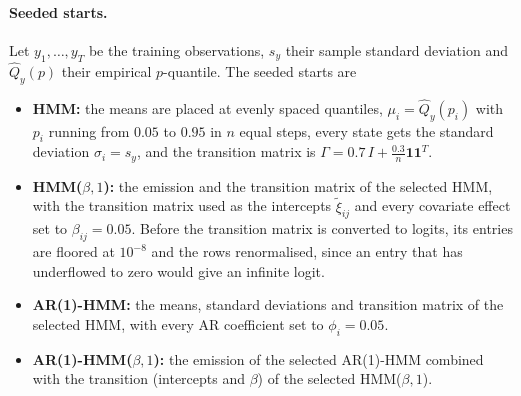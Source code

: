 \paragraph{Seeded starts.}
Let $y_1, \dots, y_T$ be the training observations, $s_y$ their sample standard
deviation and $\hat{Q}_y(p)$ their empirical $p$-quantile. The seeded starts
are
\begin{itemize}
    \item \textbf{HMM:} the means are placed at evenly spaced quantiles,
    $\mu_i = \hat{Q}_y(p_i)$ with $p_i$ running from $0.05$ to $0.95$ in $n$
    equal steps, every state gets the standard deviation $\sigma_i = s_y$, and
    the transition matrix is $\Gamma = 0.7\, I + \frac{0.3}{n} \mathbf{1}\mathbf{1}^{T}$.
    \item \textbf{HMM($\beta, 1$):} the emission and the transition matrix of the
    selected HMM, with the transition matrix used as the intercepts
    $\tilde{\xi}_{ij}$ and every covariate effect set to $\beta_{ij} = 0.05$.
    Before the transition matrix is converted to logits, its entries are
    floored at $10^{-8}$ and the rows renormalised, since an entry that has
    underflowed to zero would give an infinite logit.
    \item \textbf{AR(1)-HMM:} the means, standard deviations and transition
    matrix of the selected HMM, with every AR coefficient set to $\phi_i = 0.05$.
    \item \textbf{AR(1)-HMM($\beta, 1$):} the emission of the selected AR(1)-HMM
    combined with the transition (intercepts and $\beta$) of the selected
    HMM($\beta, 1$).
\end{itemize}

